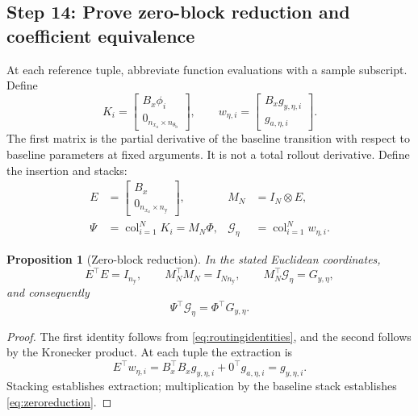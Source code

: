 \documentclass[11pt,a4paper]{article}
\newcommand{\col}{\operatorname{col}}
\newtheorem{proposition}{Proposition}
\begin{document}
\subsection*{Step 14: Prove zero-block reduction and coefficient equivalence}
At each reference tuple, abbreviate function evaluations with a sample subscript. Define
\begin{equation}\label{eq:samplebasis}
K_i=\begin{bmatrix}B_x\phi_i\\0_{n_{x_a}\times n_{\theta_{\mathrm b}}}\end{bmatrix},\qquad
w_{\eta,i}=\begin{bmatrix}B_xg_{y,\eta,i}\\g_{a,\eta,i}\end{bmatrix}.
\end{equation}
The first matrix is the partial derivative of the baseline transition with respect to baseline parameters at fixed arguments. It is not a total rollout derivative. Define the insertion and stacks:
\begin{equation}\label{eq:augmentedstacks}
\begin{aligned}
E&=\begin{bmatrix}B_x\\0_{n_{x_a}\times n_{\mathrm y}}\end{bmatrix},&M_N&=I_N\otimes E,\\
\Psi&=\col_{i=1}^N K_i=M_N\Phi,&\mathcal G_\eta&=\col_{i=1}^N w_{\eta,i}.
\end{aligned}
\end{equation}
\begin{proposition}[Zero-block reduction]\label{prop:zero}
In the stated Euclidean coordinates,
\begin{equation}\label{eq:extraction}
E^\top E=I_{n_{\mathrm y}},\qquad M_N^\top M_N=I_{Nn_{\mathrm y}},\qquad
M_N^\top\mathcal G_\eta=G_{y,\eta},
\end{equation}
and consequently
\begin{equation}\label{eq:zeroreduction}
\Psi^\top\mathcal G_\eta=\Phi^\top G_{y,\eta}.
\end{equation}
\end{proposition}
\begin{proof}
The first identity follows from \eqref{eq:routingidentities}, and the second follows by the Kronecker product. At each tuple the extraction is
\begin{equation}\label{eq:sampleextraction}
E^\top w_{\eta,i}=B_x^\top B_xg_{y,\eta,i}+0^\top g_{a,\eta,i}=g_{y,\eta,i}.
\end{equation}
Stacking establishes extraction; multiplication by the baseline stack establishes \eqref{eq:zeroreduction}.
\end{proof}
\end{document}
